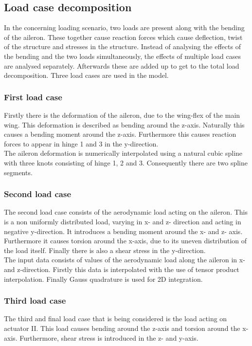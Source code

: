 \subsection{Load case decomposition}
\label{subsec:load_decomposition}
In the concerning loading scenario, two loads are present along with the bending of the aileron. These together cause reaction forces which cause deflection, twist of the structure and stresses in the structure. Instead of analysing the effects of the bending and the two loads simultaneously, the effects of multiple load cases are analysed separately. Afterwards these are added up to get to the total load decomposition. Three load cases are used in the model.

\subsubsection{First load case}
\noindent Firstly there is the deformation of the aileron, due to the wing-flex of the main wing. This deformation is described as bending around the z-axis. Naturally this causes a bending moment around the z-axis. Furthermore this causes reaction forces to appear in hinge 1 and 3 in the y-direction.\\

\noindent The aileron deformation is numerically interpolated using a natural cubic spline with three knots consisting of hinge 1, 2 and 3. Consequently there are two spline segments.

\subsubsection{Second load case}
\noindent The second load case consists of the aerodynamic load acting on the aileron. This is a non uniformly distributed load, varying in x- and z- direction and acting in negative y-direction. It introduces a bending moment around the x- and z- axis. Furthermore it causes torsion around the x-axis, due to its uneven distribution of the load itself. Finally there is also a shear stress in the y-direction. \\

\noindent The input data consists of values of the aerodynamic load along the aileron in x- and z-direction. Firstly this data is interpolated with the use of tensor product interpolation. Finally Gauss quadrature is used for 2D integration.

\subsubsection{Third load case}
\noindent The third and final load case that is being considered is the load acting on actuator II. This load causes bending around the z-axis and torsion around the x-axis. Furthermore, shear stress is introduced in the z- and y-axis.

